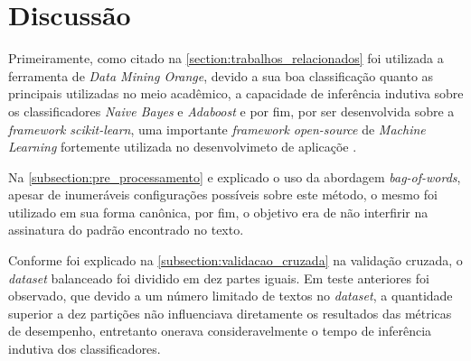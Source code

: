 \section{Discussão}

Primeiramente, como citado na \autoref{section:trabalhos_relacionados} foi 
utilizada a ferramenta de \textit{Data Mining Orange}, devido a sua boa 
classificação quanto as principais utilizadas no meio acadêmico, a capacidade 
de inferência indutiva sobre os classificadores \textit{Naive Bayes} e 
\textit{Adaboost} e por fim, por ser desenvolvida sobre a 
\textit{framework scikit-learn}, uma importante \textit{framework open-source} 
de \textit{Machine Learning} fortemente utilizada no desenvolvimeto de 
aplicaçõe \cite{scikit-learn}.

Na \autoref{subsection:pre_processamento} e explicado o uso da abordagem
\textit{bag-of-words}, apesar de inumeráveis configurações possíveis sobre este 
método, o mesmo foi utilizado em sua forma canônica, por fim, o objetivo era de 
não interfirir na assinatura do padrão encontrado no texto.

Conforme foi explicado na \autoref{subsection:validacao_cruzada} na validação 
cruzada, o \textit{dataset} balanceado foi dividido em dez partes iguais. Em 
teste anteriores foi observado, que devido a um número limitado de textos no 
\textit{dataset}, a quantidade superior a dez partições não influenciava 
diretamente os resultados das métricas de desempenho, entretanto onerava 
consideravelmente o tempo de inferência indutiva dos classificadores.